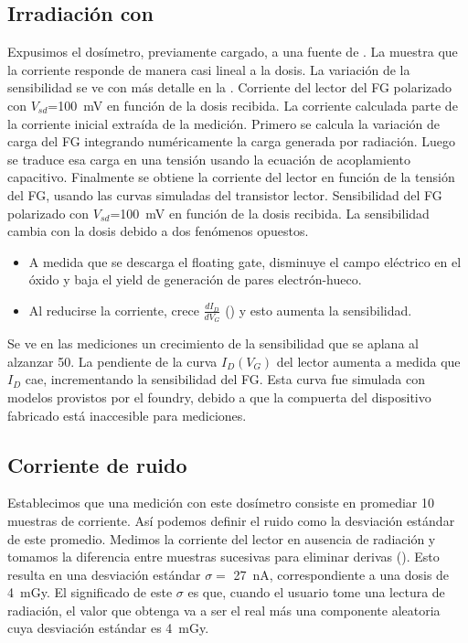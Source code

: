 \subsection{Irradiación con \Strontium}
Expusimos el dosímetro,
previamente cargado,
a una fuente de \Strontium.
La  muestra que la corriente responde de
manera casi lineal a la dosis.
La variación de la sensibilidad se ve con más detalle en la
.
{Corriente del lector del FG polarizado con
    $V_{sd}$=\SI{100}{\milli\volt} en función de la dosis recibida.
La corriente calculada parte de la corriente inicial extraída de la
medición.
Primero se calcula la variación de carga del FG 
integrando numéricamente la carga generada por radiación.
Luego se traduce esa carga en una tensión
usando la ecuación de acoplamiento capacitivo.
Finalmente se obtiene la corriente del lector
en función de la tensión del FG,
usando las curvas simuladas del transistor lector.}
{Sensibilidad del FG polarizado con
    $V_{sd}$=\SI{100}{\milli\volt} en función de la dosis recibida.
}
La sensibilidad cambia con la dosis debido a dos fenómenos opuestos.
\begin{itemize}
    \item A medida que se descarga el floating gate, disminuye el 
        campo eléctrico en el óxido y baja el yield de generación de pares 
        electrón-hueco.
    \item Al reducirse la corriente, crece $\frac{dI_D}{dV_G}$ 
        () y esto aumenta la sensibilidad.
\end{itemize}
Se ve en las mediciones un crecimiento de la sensibilidad que se aplana al
alzanzar \SI{50}{\Gray}.
{La pendiente de la curva $I_D(V_G)$ del lector aumenta a medida que $I_D$ cae,
incrementando la sensibilidad del FG.
Esta curva fue simulada con modelos provistos por el foundry,
debido a que la compuerta del dispositivo fabricado está inaccesible para
mediciones.}
\subsection{Corriente de ruido}
Establecimos que una medición con este dosímetro consiste en promediar 10
muestras de corriente.
Así podemos definir el ruido como la desviación estándar de este promedio.
Medimos la corriente del lector en ausencia de radiación y
tomamos la diferencia entre muestras sucesivas para eliminar derivas
().
Esto resulta en una desviación estándar
$\sigma=$ \SI{27}{\nano\ampere},
correspondiente a una dosis de \SI{4}{\milli\gray}.
El significado de este $\sigma$ es que,
cuando el usuario tome una lectura de radiación,
el valor que obtenga va a ser el real más una componente aleatoria
cuya desviación estándar es \SI{4}{\milli\gray}.
